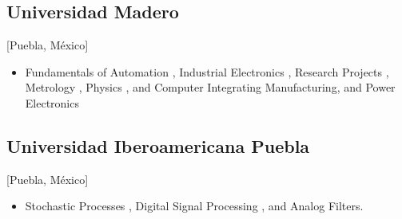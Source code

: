 \documentclass{mycv}
\begin{document}
\subsection{Universidad Madero}[Puebla, M\'exico]
\vspace{1mm}
\begin{positions}
\end{positions}
\begin{itemize}
	I led curriculum preparaton, topic presentation and preparation for student evaluation
	\vspace{-1mm}
	\item Fundamentals of Automation \href{https://sites.google.com/site/perezxochicale/digital-electronics}{\faExternalLink*}, 
	Industrial Electronics \href{https://sites.google.com/site/perezxochicale/ie}{\faExternalLink*},
	Research Projects \href{https://sites.google.com/site/perezxochicale/latex/thesistemplate}{\faExternalLink*},
	Metrology \href{https://sites.google.com/site/perezxochicale/metrology}{\faExternalLink*},
	Physics \href{http://goo.gl/fffnG}{\faExternalLink*}, and 
	Computer Integrating Manufacturing, and Power Electronics
\end{itemize}

\subsection{Universidad Iberoamericana Puebla}[Puebla, M\'exico]
\vspace{1mm}
\begin{positions}
\end{positions}
\begin{itemize}
	I led curriculum preparaton, topic presentation and preparation for student evaluation
	\vspace{-1mm}
	\item Stochastic Processes \href{https://sites.google.com/site/perezxochicale/stochastic-processes-course}{\faExternalLink*}, 
	Digital Signal Processing \href{https://sites.google.com/site/perezxochicale/digital-signal-processing-course}{\faExternalLink*}, 
	and Analog Filters.
\end{itemize}
\end{document}
